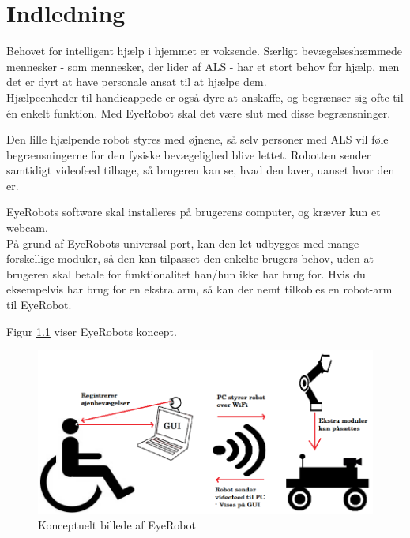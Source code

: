 \chapter{Indledning}
Behovet for intelligent hjælp i hjemmet er voksende. Særligt bevægelseshæmmede mennesker - som mennesker, der lider af ALS - har et stort behov for hjælp, men det er dyrt at have personale ansat til at hjælpe dem. \\ 
Hjælpeenheder til handicappede er også dyre at anskaffe, og begrænser sig ofte til én enkelt funktion. Med EyeRobot skal det være slut med disse begrænsninger.

Den lille hjælpende robot styres med øjnene, så selv personer med ALS vil føle begrænsningerne for den fysiske bevægelighed blive lettet. 
Robotten sender samtidigt videofeed tilbage, så brugeren kan se, hvad den laver, uanset hvor den er.

EyeRobots software skal installeres på brugerens computer, og kræver kun et webcam. \\
På grund af EyeRobots universal port, kan den let udbygges med mange forskellige moduler, så den kan tilpasset den enkelte brugers behov, uden at brugeren skal betale for funktionalitet han/hun ikke har brug for. 
Hvis du eksempelvis har brug for en ekstra arm, så kan der nemt tilkobles en robot-arm til EyeRobot.

Figur \ref{fig:Rigt_billede} viser EyeRobots koncept.

\begin{figure}[tbph]
	\centering
	\includegraphics[width = \textwidth]{figur/Rigt_billede.png}
	\caption{Konceptuelt billede af EyeRobot}
	\label{fig:Rigt_billede}
\end{figure}